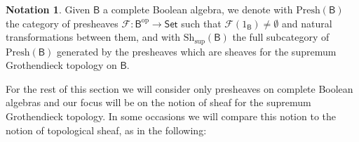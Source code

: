 \documentclass[11pt]{amsart}
\newcommand{\F}{\mathcal{F}}
\newcommand{\Presh}{\textrm{Presh}}
\newcommand{\Sh}{\textrm{Sh}}
\theoremstyle{plain}
\theoremstyle{definition}
\newtheorem{definition}[theorem]{Definition}
\newtheorem{notation}[theorem]{Notation}
\theoremstyle{plain}
\theoremstyle{remark}
\newcommand{\dSet}{\mathsf{Set}}
\newcommand{\bool}[1]{\mathsf{#1}}
\newcommand{\0}{\mathsf{0}}
\renewcommand{\1}{\mathsf{1}}
\renewcommand{\2}{\mathsf{2}}
\theoremstyle{definition}
\begin{document}


\begin{notation}
Given $\bool{B}$ a complete Boolean algebra, we denote with $\Presh(\bool{B})$ the category of presheaves $\F:\bool{B}^{\mathrm{op}}\to\dSet$ such that $\F(1_{\bool{B}})\neq \emptyset$ and natural transformations between them, and with $\Sh_\mathrm{sup}(\bool{B})$ the full subcategory of $\Presh(\bool{B})$ generated by the presheaves which are sheaves for the supremum Grothendieck topology on $\bool{B}$.
\end{notation}
For the rest of this section we will consider only presheaves on complete Boolean algebras and our focus will be on the notion of sheaf for the supremum Grothendieck topology. In some occasions we will compare this notion to the notion of topological sheaf, as in the following:






%






\end{document}
